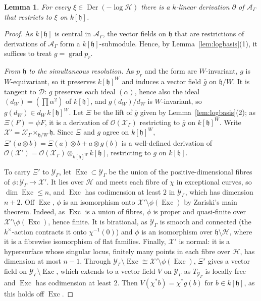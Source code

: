\documentclass[11pt]{amsart}
\numberwithin{table}{section}
\numberwithin{figure}{section}
\numberwithin{equation}{section}
\newtheorem{lem}[thm]{Lemma}
\theoremstyle{definition}
\theoremstyle{plain}
\newcommand{\cA}{\mathcal{A}}
\newcommand{\cO}{\mathcal{O}}
\newcommand{\cX}{\mathcal{X}}
\newcommand{\cY}{\mathcal{Y}}
\newcommand{\h}{\mathfrak{h}}
\DeclareMathOperator{\Der}{Der}
\begin{document}
\begin{lem}\label{lem:derlift}
For every $\xi \in \Der(-\log\mathcal H)$ there is a $k$-linear derivation $\partial$ of $\cA_\Gamma$ that restricts to $\xi$ on $k[\h]$.
\end{lem}

\begin{proof}
As $k[\h]$ is central in $\cA_\Gamma$, the vector fields on $\h$ that are restrictions of derivations of $\cA_\Gamma$ form a $k[\h]$-submodule. Hence, by Lemma~\ref{lem:logbasis}(1), it suffices to treat $g = \operatorname{grad} p_r$.

\emph{From $\h$ to the simultaneous resolution.} As $p_r$ and the form are $W$-invariant, $g$ is $W$-equivariant, so it preserves $k[\h]^W$ and induces a vector field $\bar g$ on $\h/W$. It is tangent to $\mathcal D$: $g$ preserves each ideal $(\alpha)$, hence also the ideal $(d_W) = (\prod\alpha^2)$ of $k[\h]$, and $g(d_W)/d_W$ is $W$-invariant, so $g(d_W) \in d_W\,k[\h]^W$. Let $\Xi$ be the lift of $\bar g$ given by Lemma~\ref{lem:logbasis}(2); as $\Xi(F) = \psi F$, it is a derivation of $\cO(\cX_\Gamma)$ restricting to $\bar g$ on $k[\h]^W$. Write $\cX' = \cX_\Gamma \times_{\h/W} \h$. Since $\Xi$ and $g$ agree on $k[\h]^W$, $\Xi'(a \otimes b) = \Xi(a) \otimes b + a \otimes g(b)$ is a well-defined derivation of $\cO(\cX') = \cO(\cX_\Gamma) \otimes_{k[\h]^W} k[\h]$, restricting to $g$ on $k[\h]$.

To carry $\Xi'$ to $\cY_\Gamma$, let $\operatorname{Exc} \subset \cY_\Gamma$ be the union of the positive-dimensional fibres of $\phi\colon \cY_\Gamma \to \cX'$. It lies over $\mathcal H$ and meets each fibre of $\chi$ in exceptional curves, so $\dim \operatorname{Exc} \le n$, and $\operatorname{Exc}$ has codimension at least $2$ in $\cY_\Gamma$, which has dimension $n + 2$. Off $\operatorname{Exc}$, $\phi$ is an isomorphism onto $\cX' \setminus \phi(\operatorname{Exc})$ by Zariski's main theorem. Indeed, as $\operatorname{Exc}$ is a union of fibres, $\phi$ is proper and quasi-finite over $\cX' \setminus \phi(\operatorname{Exc})$, hence finite. It is birational, as $\cY_\Gamma$ is smooth and connected (the $k^\times$-action contracts it onto $\chi^{-1}(0)$) and $\phi$ is an isomorphism over $\h \setminus \mathcal H$, where it is a fibrewise isomorphism of flat families. Finally, $\cX'$ is normal: it is a hypersurface whose singular locus, finitely many points in each fibre over $\mathcal H$, has dimension at most $n - 1$. Through $\cY_\Gamma \setminus \operatorname{Exc} \cong \cX' \setminus \phi(\operatorname{Exc})$, $\Xi'$ gives a vector field on $\cY_\Gamma \setminus \operatorname{Exc}$, which extends to a vector field $V$ on $\cY_\Gamma$ as $T_{\cY_\Gamma}$ is locally free and $\operatorname{Exc}$ has codimension at least $2$. Then $V(\chi^*b) = \chi^*g(b)$ for $b \in k[\h]$, as this holds off $\operatorname{Exc}$.


\end{proof}
\end{document}

